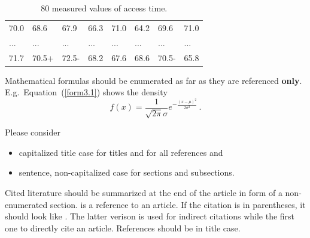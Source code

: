\documentclass[article]{ajs}
\begin{document}
\begin{table}[hbt]
\caption{\label{Tab3.4}80 measured values of access time.}
\vspace*{-5mm}
\small
\hspace{1.5cm}
\begin{center}
\begin{tabular}{|llllllll|}
\toprule
70.0 & 68.6 & 67.9 & 66.3 & 71.0 & 64.2 & 69.6 & 71.0\\
... & ... & ... & ... & ... & ... & ... & ...\\
71.7 & 70.5+& 72.5-& 68.2 & 67.6 & 68.6 & 70.5-& 65.8\\
\bottomrule
\end{tabular}
\end{center}
\end{table}

Mathematical formulas should be enumerated as far as they are
referenced \textbf{only}. E.g.~Equation~(\ref{form3.1}) shows the density 
\begin{equation}\label{form3.1}
f(x) =
\frac1{\sqrt{2\pi}\sigma}e^{-\frac{(x-\mu)^2}{2\sigma^2}}\,.
\end{equation}

Please consider 

\begin{itemize}
\item  capitalized title case for titles and for all references and 
\item sentence, non-capitalized case for sections and subsections.
\end{itemize}


Cited literature should be summarized at the end of the article in
form of a non-enumerated section. \cite{knitr} is a reference
to an article. If the citation is in parentheses, it
should look like \citep{knitr}. The latter verison is used for indirect citations while the first one to directly cite an article.
References should be in title case.
\end{document}
